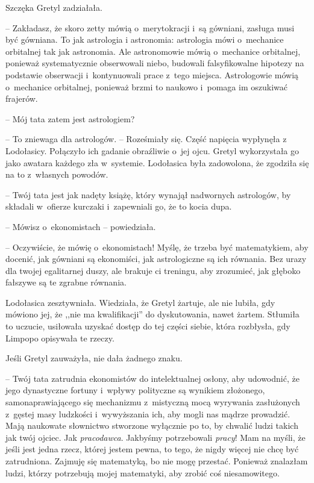 \documentclass[oneside,polish,11pt,sfheadings]{mwbk}
\begin{document}
Szczęka Gretyl zadziałała. 

-- Zakładasz, że skoro zetty mówią o~merytokracji i~są gówniani, zasługa musi być gówniana. To jak astrologia
i astronomia: astrologia mówi o~mechanice orbitalnej tak jak astronomia.
Ale astronomowie mówią o~mechanice orbitalnej, ponieważ systematycznie
obserwowali niebo, budowali falsyfikowalne hipotezy na podstawie
obserwacji i~kontynuowali prace z~tego miejsca. Astrologowie mówią o~mechanice orbitalnej, ponieważ brzmi to naukowo i~pomaga im oszukiwać
frajerów.

-- Mój tata zatem jest astrologiem?

-- To zniewaga dla astrologów. -- Roześmiały się. Część napięcia wypłynęła
z Lodołasicy. Połączyło ich gadanie obraźliwie o~jej ojcu. Gretyl
wykorzystała go jako awatara każdego zła w~systemie. Lodołasica była
zadowolona, że zgodziła się na to z~własnych powodów. 

-- Twój tata jest
jak nadęty książę, który wynajął nadwornych astrologów, by składali w~ofierze kurczaki i~zapewniali go, że to kocia dupa.

-- Mówisz o~ekonomistach -- powiedziała.

-- Oczywiście, że mówię o~ekonomistach! Myślę, że trzeba być
matematykiem, aby docenić, jak gówniani są ekonomiści, jak astrologiczne
są ich równania. Bez urazy dla twojej egalitarnej duszy, ale brakuje ci
treningu, aby zrozumieć, jak głęboko fałszywe są te zgrabne równania.

Lodołasica zesztywniała. Wiedziała, że Gretyl żartuje, ale nie lubiła,
gdy mówiono jej, że ,,nie ma kwalifikacji'' do dyskutowania, nawet
żartem. Stłumiła to uczucie, usiłowała uzyskać dostęp do tej części
siebie, która rozbłysła, gdy Limpopo opisywała te rzeczy.

Jeśli Gretyl zauważyła, nie dała żadnego znaku. 

-- Twój tata zatrudnia
ekonomistów do intelektualnej osłony, aby udowodnić, że jego dynastyczne
fortuny i~wpływy polityczne są wynikiem złożonego, samonaprawiającego
się mechanizmu z~mistyczną mocą wyrywania zasłużonych z~gęstej masy
ludzkości i~wywyższania ich, aby mogli nas mądrze prowadzić. Mają
naukowate słownictwo stworzone wyłącznie po to, by chwalić ludzi takich
jak twój ojciec. Jak \textit{pracodawca}. Jakbyśmy potrzebowali
\textit{pracy}! Mam na myśli, że jeśli jest jedna rzecz, której jestem
pewna, to tego, że nigdy więcej nie chcę być zatrudniona. Zajmuję się
matematyką, bo nie mogę przestać. Ponieważ znalazłam ludzi, którzy
potrzebują mojej matematyki, aby zrobić coś niesamowitego.
\end{document}
